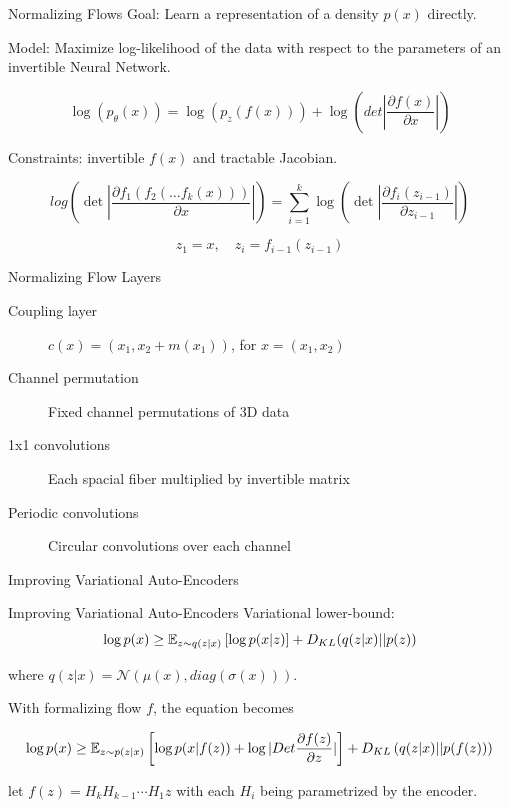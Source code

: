 \begin{frame}{Normalizing Flows}
 	\alert{Goal:} Learn a representation of a density $p(x)$ directly.

	\alert{Model:} Maximize log-likelihood of the data with respect to the parameters of an invertible Neural Network.

	$$
		\log( p_\theta(x) ) = \log( p_z(f(x)) ) + \log( det |\frac{\partial f(x)}{\partial x}| )
	$$

	\alert{Constraints:} invertible $f(x)$ and tractable Jacobian.


	$$
		log\left( \det | \frac{\partial f_1(f_2(\dots f_k(x)))}{\partial x} | \right) = \sum_{i=1}^k \log \left( \det | \frac{\partial f_i(z_{i-1})}{\partial z_{i-1}} | \right)
	$$

	$$
		z_1 = x, \quad z_i = f_{i-1}(z_{i-1})
	$$
\end{frame}

\begin{frame}{Normalizing Flow Layers}
	\begin{description}
		\item[Coupling layer] $c(x) = (x_1, x_2 + m(x_1))$, for $x = (x_1, x_2)$~\cite{nice}
		\item[Channel permutation] Fixed channel permutations of 3D data~\cite{realnvp}
		\item[1x1 convolutions] Each spacial fiber multiplied by invertible matrix~\cite{glow}
		\item[Periodic convolutions] Circular convolutions over each channel~\cite{emerging}
	\end{description}
\end{frame}





\begin{frame}[standout]
	Improving Variational Auto-Encoders
\end{frame}

\begin{frame}{Improving Variational Auto-Encoders}
	Variational lower-bound:
	$$
		\log p(x) \geq \mathbb{E}_{z \sim q(z | x)}\left[ \log p(x | z) \right] + D_{KL}(q(z|x) || p(z))
	$$

	where $q(z|x) = \mathcal{N}(\mu(x), diag(\sigma(x)))$.

	With formalizing flow $f$, the equation becomes

	$$
	\log p(x) \geq  \mathbb{E}_{z\sim p(z|x)}\left[ \log p(x|f(z)) + \log |Det\frac{\partial f(z)}{\partial z}|\right] + D_{KL}\left(q(z|x) || p(f(z))\right)
	$$

	\cite{houseVAE} let $f(z) = H_kH_{k-1}\cdots H_1z$ with each $H_i$ being parametrized by the encoder.
	
\end{frame}

